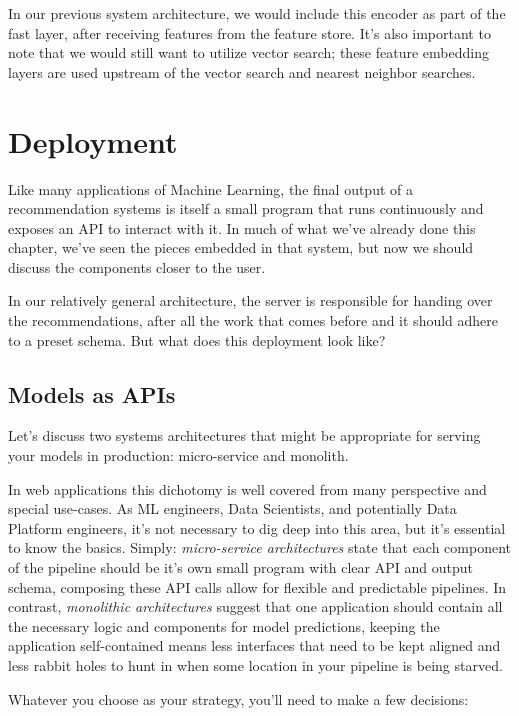 In our previous system architecture, we would include this encoder as part of the fast layer, after receiving features from the feature store. It's also important to note that we would still want to utilize vector search; these feature embedding layers are used upstream of the vector search and nearest neighbor searches.

\section{Deployment}

Like many applications of Machine Learning, the final output of a recommendation systems is itself a small program that runs continuously and exposes an API to interact with it. In much of what we've already done this chapter, we've seen the pieces embedded in that system, but now we should discuss the components closer to the user. 

In our relatively general architecture, the server is responsible for handing over the recommendations, after all the work that comes before and it should adhere to a preset schema. But what does this deployment look like?

\subsection{Models as APIs}

Let's discuss two systems architectures that might be appropriate for serving your models in production: micro-service and monolith.

In web applications this dichotomy is well covered from many perspective and special use-cases. As ML engineers, Data Scientists, and potentially Data Platform engineers, it's not necessary to dig deep into this area, but it's essential to know the basics. Simply: \emph{micro-service architectures} state that each component of the pipeline should be it's own small program with clear API and output schema, composing these API calls allow for flexible and predictable pipelines. In contrast, \emph{monolithic architectures} suggest that one application should contain all the necessary logic and components for model predictions, keeping the application self-contained means less interfaces that need to be kept aligned and less rabbit holes to hunt in when some location in your pipeline is being starved.

Whatever you choose as your strategy, you'll need to make a few decisions:

